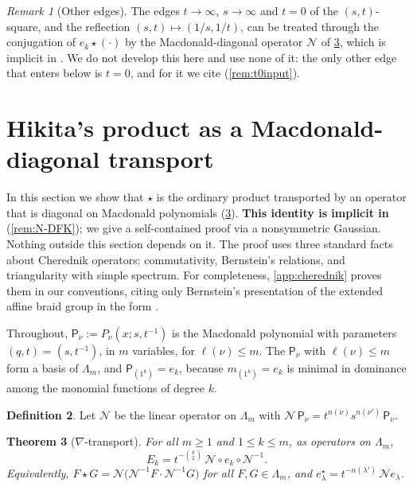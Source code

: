 \documentclass[11pt]{amsart}
\newtheorem{theorem}{Theorem}[section]
\theoremstyle{definition}
\newtheorem{definition}[theorem]{Definition}
\theoremstyle{remark}
\newtheorem{remark}[theorem]{Remark}
\numberwithin{equation}{section}
\newcommand{\Lam}{\Lambda}
\begin{document}
\begin{remark}[Other edges]\label{rem:edges}
The edges $t\to\infty$, $s\to\infty$ and $t=0$ of the $(s,t)$-square, and the reflection $(s,t)\mapsto(1/s,1/t)$, can be treated through the conjugation of $e_k\star(\cdot)$ by the Macdonald-diagonal operator $\mathcal N$ of \cref{thm:N}, which is implicit in \cite{DFK19}. We do not develop this here and use none of it: the only other edge that enters below is $t=0$, and for it we cite \cite{DFK18} (\cref{rem:t0input}).
\end{remark}


\section{Hikita's product as a Macdonald-diagonal transport}\label{sec:nabla}
In this section we show that $\star$ is the ordinary product transported by an operator that is diagonal on Macdonald polynomials (\cref{thm:N}). \textbf{This identity is implicit in \cite{DFK19}} (\cref{rem:N-DFK}); we give a self-contained proof via a nonsymmetric Gaussian. Nothing outside this section depends on it. The proof uses three standard facts about Cherednik operators: commutativity, Bernstein's relations, and triangularity with simple spectrum. For completeness, \cref{app:cherednik} proves them in our conventions, citing only Bernstein's presentation of the extended affine braid group in the form \cite[Thm.~4.2]{Haiman06}.

Throughout, $\mathsf P_\nu:=P_\nu(x;s,t^{-1})$ is the Macdonald polynomial \cite[VI \S4]{Macdonald95} with parameters $(q,t)=(s,t^{-1})$, in $m$ variables, for $\ell(\nu)\le m$. The $\mathsf P_\nu$ with $\ell(\nu)\le m$ form a basis of $\Lam_m$, and $\mathsf P_{(1^k)}=e_k$, because $m_{(1^k)}=e_k$ is minimal in dominance among the monomial functions of degree $k$.

\begin{definition}\label{def:N}
Let $\mathcal N$ be the linear operator on $\Lam_m$ with $\mathcal N\,\mathsf P_\nu=t^{n(\nu)}s^{n(\nu')}\,\mathsf P_\nu$.
\end{definition}

\begin{theorem}[$\nabla$-transport]\label{thm:N}
For all $m\ge1$ and $1\le k\le m$, as operators on $\Lam_m$,
\[ E_k=t^{-\binom k2}\,\mathcal N\circ e_k\circ\mathcal N^{-1}. \]
Equivalently, $F\star G=\mathcal N\bigl(\mathcal N^{-1}F\cdot\mathcal N^{-1}G\bigr)$ for all $F,G\in\Lam_m$, and $e^\star_\lambda=t^{-n(\lambda')}\,\mathcal N e_\lambda$.
\end{theorem}
\end{document}

